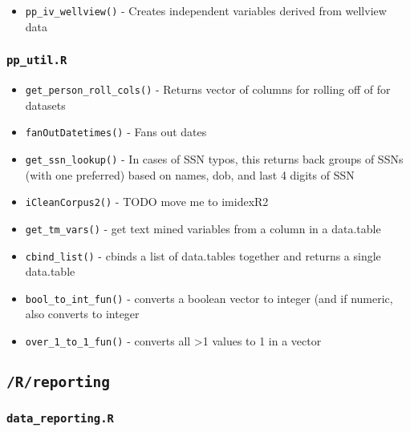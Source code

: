 \documentclass[
]{book}
\providecommand{\tightlist}{%
  \setlength{\itemsep}{0pt}\setlength{\parskip}{0pt}}
\begin{document}
\begin{itemize}
\tightlist
\item
  \texttt{pp\_iv\_wellview()} - Creates independent variables derived from wellview data
\end{itemize}

\hypertarget{pp_util.r}{%
\subsubsection{\texorpdfstring{\texttt{pp\_util.R}}{pp\_util.R}}\label{pp_util.r}}

\begin{itemize}
\tightlist
\item
  \texttt{get\_person\_roll\_cols()} - Returns vector of columns for rolling off of for datasets
\item
  \texttt{fanOutDatetimes()} - Fans out dates
\item
  \texttt{get\_ssn\_lookup()} - In cases of SSN typos, this returns back groups of SSNs (with one preferred) based on names, dob, and last 4 digits of SSN
\item
  \texttt{iCleanCorpus2()} - TODO move me to imidexR2
\item
  \texttt{get\_tm\_vars()} - get text mined variables from a column in a data.table
\item
  \texttt{cbind\_list()} - cbinds a list of data.tables together and returns a single data.table
\item
  \texttt{bool\_to\_int\_fun()} - converts a boolean vector to integer (and if numeric, also converts to integer
\item
  \texttt{over\_1\_to\_1\_fun()} - converts all \textgreater1 values to 1 in a vector
\end{itemize}

\hypertarget{rreporting}{%
\subsection{\texorpdfstring{\texttt{/R/reporting}}{/R/reporting}}\label{rreporting}}

\hypertarget{data_reporting.r}{%
\subsubsection{\texorpdfstring{\texttt{data\_reporting.R}}{data\_reporting.R}}\label{data_reporting.r}}
\end{document}

